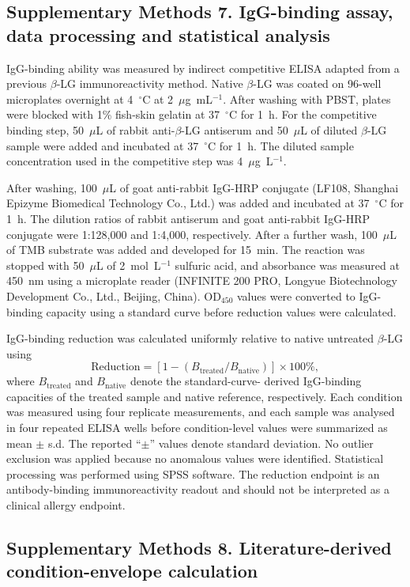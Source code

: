 \subsection*{Supplementary Methods 7. IgG-binding assay, data processing and statistical analysis}

IgG-binding ability was measured by indirect competitive ELISA adapted from a
previous $\beta$-LG immunoreactivity method. Native $\beta$-LG was coated on
96-well microplates overnight at 4~$^\circ$C at 2~$\mu$g~mL$^{-1}$. After
washing with PBST, plates were blocked with 1\% fish-skin gelatin at
37~$^\circ$C for 1~h. For the competitive binding step, 50~$\mu$L of rabbit
anti-$\beta$-LG antiserum and 50~$\mu$L of diluted $\beta$-LG sample were added
and incubated at 37~$^\circ$C for 1~h. The diluted sample concentration used in
the competitive step was 4~$\mu$g~L$^{-1}$.

After washing, 100~$\mu$L of goat anti-rabbit IgG-HRP conjugate (LF108, Shanghai
Epizyme Biomedical Technology Co., Ltd.) was added and incubated at 37~$^\circ$C
for 1~h. The dilution ratios of rabbit antiserum and goat anti-rabbit IgG-HRP
conjugate were 1:128,000 and 1:4,000, respectively. After a further wash,
100~$\mu$L of TMB substrate was added and developed for 15~min. The reaction was
stopped with 50~$\mu$L of 2~mol~L$^{-1}$ sulfuric acid, and absorbance was
measured at 450~nm using a microplate reader (INFINITE 200 PRO, Longyue
Biotechnology Development Co., Ltd., Beijing, China). OD$_{450}$ values were
converted to IgG-binding capacity using a standard curve before reduction values
were calculated.

IgG-binding reduction was calculated uniformly relative to native untreated
$\beta$-LG using
\[
  \mathrm{Reduction} = \left[1 -
  \left(B_{\mathrm{treated}}/B_{\mathrm{native}}\right)\right] \times 100\%,
\]
where $B_{\mathrm{treated}}$ and $B_{\mathrm{native}}$ denote the standard-curve-
derived IgG-binding capacities of the treated sample and native reference,
respectively. Each condition was measured using four replicate measurements, and
each sample was analysed in four repeated ELISA wells before condition-level
values were summarized as mean $\pm$ s.d. The reported ``$\pm$'' values denote
standard deviation. No outlier exclusion was applied because no anomalous values
were identified. Statistical processing was performed using SPSS software. The
reduction endpoint is an antibody-binding immunoreactivity readout and should
not be interpreted as a clinical allergy endpoint.
\subsection*{Supplementary Methods 8. Literature-derived condition-envelope calculation}

